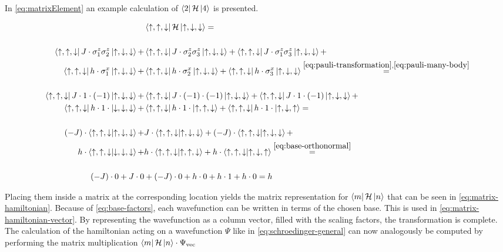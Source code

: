 In \ref{eq:matrixElement} an example calculation of $\bra{2}\mathcal{H}\ket{4}$ is presented.

\begin{equation}
    \label{eq:matrixElement}
    \begin{split}
        &\bra{\up, \up, \down} \hamiltonian \ket{\up, \down, \down} = \\\\ %
         \bra{\up, \up, \down} J\cdot \sigma^z_1\sigma^z_2 \ket{\up, \down, \down} +
         &\bra{\up, \up, \down} J\cdot \sigma^z_2\sigma^z_3 \ket{\up, \down, \down} +
         \bra{\up, \up, \down} J\cdot \sigma^z_1\sigma^z_3 \ket{\up, \down, \down} +\\
         \bra{\up, \up, \down} h\cdot \sigma^x_1 \ket{\up, \down, \down} +
         &\bra{\up, \up, \down} h\cdot \sigma^x_2 \ket{\up, \down, \down} +
         \bra{\up, \up, \down} h\cdot \sigma^x_3 \ket{\up, \down, \down}\stackrel{\ref{eq:pauli-transformation}, \ref{eq:pauli-many-body}}{=}\\\\ %
          \bra{\up, \up, \down} J\cdot  1 \cdot (-1) \ket{\up, \down, \down} +
         & \bra{\up, \up, \down} J\cdot (-1) \cdot (-1) \ket{\up, \down, \down} +
          \bra{\up, \up, \down} J\cdot  1 \cdot (-1) \ket{\up, \down, \down} +\\
          \bra{\up, \up, \down} h\cdot  1 \cdot \ket{\down, \down, \down} +
         & \bra{\up, \up, \down} h\cdot 1 \cdot \ket{\up, \up, \down} +
          \bra{\up, \up, \down} h\cdot  1 \cdot \ket{\up, \down, \up} =\\\\ %
          (-J)\cdot      \bra{\up, \up, \down}  \ket{\up, \down, \down} +
         & J\cdot        \bra{\up, \up, \down} \ket{\up, \down, \down} +
          (-J)\cdot      \bra{\up, \up, \down}  \ket{\up, \down, \down} +\\
          h\cdot         \bra{\up, \up, \down}  \ket{\down, \down, \down} +
         & h\cdot        \bra{\up, \up, \down} \ket{\up, \up, \down} +
          h\cdot         \bra{\up, \up, \down}  \ket{\up, \down, \up}\stackrel{\ref{eq:base-orthonormal}}{=}\\\\ %
          (-J)\cdot 0 + J\cdot 0 &+  (-J)\cdot 0 + h\cdot 0  + h\cdot 1 + h\cdot 0   = h 
    \end{split}
\end{equation}

Placing them inside a matrix at the corresponding location yields the matrix representation for $\bra{m}\mathcal{H}\ket{n}$ that can be seen in \ref{eq:matrix-hamiltonian}.
Because of \ref{eq:base-factors}, each wavefunction can be written in terms of the chosen base. This is used in \ref{eq:matrix-hamiltonian-vector}. By representing the wavefunction as a column vector, filled with the scaling factors, the transformation is complete. 
The calculation of the hamiltonian \hamiltonian acting on a wavefunction $\Psi$ like in \ref{eq:schroedinger-general} can now analogously be computed by performing the matrix multiplication $\bra{m}\mathcal{H}\ket{n} \cdot \Psi_\mathrm{vec}$

